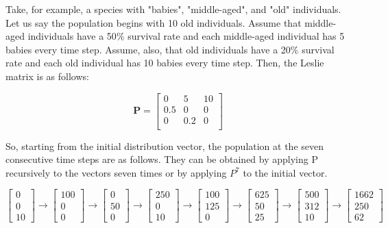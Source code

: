 \documentclass[12pt]{article}
\begin{document}
Take, for example, a species with "babies", "middle-aged", and "old" individuals. Let us say the population begins with 10 old individuals. Assume that middle-aged individuals have a 50$\%$ survival rate and each middle-aged individual has 5 babies every time step. Assume, also, that old individuals have a 20$\%$ survival rate and each old individual has 10 babies every time step. Then, the Leslie matrix is as follows:

\begin{equation*}
    \textbf{P}=
    \begin{bmatrix}
    0&5&10\\
    0.5&0&0\\
    0&0.2&0\\
    \end{bmatrix}
    \end{equation*}
    
    So, starting from the initial distribution vector, the population at the seven consecutive time steps are as follows. They can be obtained by applying P recursively to the vectors seven times or by applying $P^7$ to the initial vector.
    
    
    

\begin{equation*}
    \begin{bmatrix}
    0\\
    0\\
    10
    \end{bmatrix}
    \xrightarrow{}
    \begin{bmatrix}
    100\\0\\0
    \end{bmatrix}
    \xrightarrow{}
    \begin{bmatrix}
    0\\50\\0
    \end{bmatrix}
    \xrightarrow{}
     \begin{bmatrix}
    250\\0\\10
    \end{bmatrix}
    \xrightarrow{}
     \begin{bmatrix}
    100\\125\\0
    \end{bmatrix}
    \xrightarrow{}
     \begin{bmatrix}
    625\\50\\25
    \end{bmatrix}
    \xrightarrow{}
     \begin{bmatrix}
    500\\312\\10
    \end{bmatrix}
    \xrightarrow{}
     \begin{bmatrix}
    1662\\250\\62
    \end{bmatrix}
    
    
\end{equation*}
\end{document}
